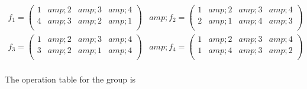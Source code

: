 \(\begin{array}{cc}
 f_1 =\left(
\begin{array}{cccc}
 1 &amp; 2 &amp; 3 &amp; 4 \\
 4 &amp; 3 &amp; 2 &amp; 1 \\
\end{array}
\right) &amp; f_2 =\left(
\begin{array}{cccc}
 1 &amp; 2 &amp; 3 &amp; 4 \\
 2 &amp; 1 &amp; 4 &amp; 3 \\
\end{array}
\right) \\
 f_3 =\left(
\begin{array}{cccc}
 1 &amp; 2 &amp; 3 &amp; 4 \\
 3 &amp; 2 &amp; 1 &amp; 4 \\
\end{array}
\right) &amp; f_4 =\left(
\begin{array}{cccc}
 1 &amp; 2 &amp; 3 &amp; 4 \\
 1 &amp; 4 &amp; 3 &amp; 2 \\
\end{array}
\right) \\
\end{array}\)



The operation table for the group is



